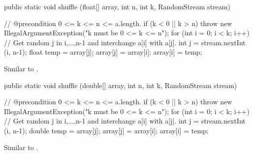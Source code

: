 \begin{code}

   public static void shuffle (float[] array, int n, int k,
                               RandomStream stream)\begin{hide} {
      // @precondition 0 <= k <= n <= a.length.
      if (k < 0 || k > n)
         throw new IllegalArgumentException("k must be   0 <= k <= n");
      for (int i = 0; i < k; i++) {
         // Get random j in {i,...,n-1} and interchange a[i] with a[j].
         int j = stream.nextInt (i, n-1);
         float temp = array[j];
         array[j] = array[i];
         array[i] = temp;
      }
   }\end{hide}
\end{code}
\begin{tabb} Similar to 
 .
\end{tabb}
\begin{htmlonly}
\end{htmlonly}
\begin{code}

   public static void shuffle (double[] array, int n, int k,
                               RandomStream stream)\begin{hide} {
      // @precondition 0 <= k <= n <= a.length.
      if (k < 0 || k > n)
         throw new IllegalArgumentException("k must be   0 <= k <= n");
      for (int i = 0; i < k; i++) {
         // Get random j in {i,...,n-1} and interchange a[i] with a[j].
         int j = stream.nextInt (i, n-1);
         double temp = array[j];
         array[j] = array[i];
         array[i] = temp;
      }
   }\end{hide}
\end{code}
\begin{tabb} Similar to 
 .
\end{tabb}
\begin{htmlonly}
\end{htmlonly}
\begin{code}\begin{hide}
}\end{hide}
\end{code}
